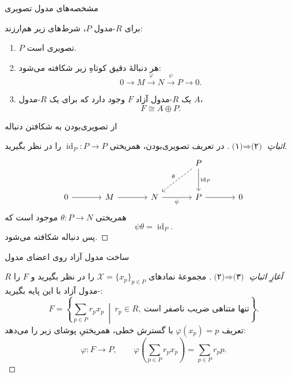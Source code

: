 \begin{frame}[t]{مشخصه‌های مدول تصویری}
\label{lec17:projective-characterizations}
\begin{theorem}
برای $R$-مدول $P$، شرط‌های زیر هم‌ارزند:
\begin{enumerate}
\item $P$ تصویری است.
\item هر دنبالهٔ دقیق کوتاهِ زیر شکافته می‌شود:
\[
0\longrightarrow M\xrightarrow{\varphi}N\xrightarrow{\psi}P
\longrightarrow0.
\]
\item یک $R$-مدول آزاد $F$ وجود دارد که برای یک $R$-مدول $A$،
\[
F\cong A\oplus P.
\]
\end{enumerate}
\end{theorem}
\end{frame}

\begin{frame}[t]{از تصویری‌بودن به شکافتن دنباله}
\label{lec17:projective-implies-split}
\begin{proof}[اثباتِ $\text{(۱)}\Rightarrow\text{(۲)}$]
در تعریف تصویری‌بودن، همریختی $\operatorname{id}_P:P\to P$ را در نظر بگیرید.
\[
\begin{tikzcd}[ampersand replacement=\&,column sep=large,row sep=large]
\&\&\&P\arrow[d,"\operatorname{id}_P"]\arrow[dl,dashed,"\theta"']\&\\
0\arrow[r]\&M\arrow[r]\&N\arrow[r,"\psi"']\&P\arrow[r]\&0
\end{tikzcd}
\]
همریختی $\theta:P\to N$ موجود است که
\[
\psi\theta=\operatorname{id}_P.
\]
پس دنباله شکافته می‌شود.
\end{proof}
\end{frame}

\begin{frame}[t]{ساخت مدول آزاد روی اعضای مدول}
\label{lec17:free-cover}
\begin{proof}[آغازِ اثباتِ $\text{(۲)}\Rightarrow\text{(۳)}$]
مجموعهٔ نمادهای $\mathcal X=\{x_p\}_{p\in P}$ را در نظر بگیرید و
$F$ را $R$-مدول آزاد با این پایه بگیرید:
\[
F=\left\{\sum_{p\in P}r_px_p\ \middle|\ r_p\in R,
\ \text{تنها متناهی ضریب ناصفر است}\right\}.
\]
تعریف $\varphi(x_p)=p$ با گسترش خطی، همریختیِ پوشای زیر را می‌دهد:
\[
\varphi:F\longrightarrow P,\qquad
\varphi\!\left(\sum_{p\in P}r_px_p\right)=\sum_{p\in P}r_pp.
\]
\end{proof}
\end{frame}

